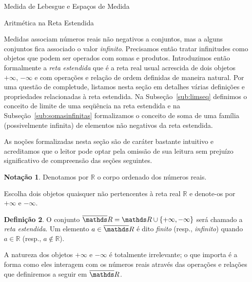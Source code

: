 \documentclass[oneside,final,11pt]{amsbook}
\newcommand{\R}{\mathds R}
\theoremstyle{remark}\newtheorem{exercise}{Exercício}[chapter]
\theoremstyle{remark}\newtheorem{*exercise}[exercise]{\hbox to 0pt{\hskip 0pt minus 1fil*}Exercício}
\theoremstyle{definition}\newtheorem{exdefin}{Definição}[chapter]
\theoremstyle{plain}\newtheorem{teo}{Teorema}[section]
\theoremstyle{plain}\newtheorem{lem}[teo]{Lema}
\theoremstyle{plain}\newtheorem{prop}[teo]{Proposição}
\theoremstyle{plain}\newtheorem{cor}[teo]{Corolário}
\theoremstyle{definition}\newtheorem{defin}[teo]{Definição}
\theoremstyle{remark}\newtheorem{rem}[teo]{Observação}
\theoremstyle{definition}\newtheorem{notation}[teo]{Notação}
\theoremstyle{definition}\newtheorem{convention}[teo]{Convenção}
\theoremstyle{definition}\newtheorem{example}[teo]{Exemplo}
\numberwithin{section}{chapter}
\numberwithin{equation}{section}
\begin{document}
\begin{chapter}{Medida de Lebesgue e Espaços de Medida}
\label{CHP:LEBESGUE}

\begin{section}{Aritmética na Reta Estendida}
\label{sec:AritRetaEstend}

Medidas associam números reais não negativos a conjuntos, mas a alguns conjuntos fica
associado o valor {\em infinito}. Precisamos então tratar infinitudes como objetos
que podem ser operados com somas e produtos. Introduzimos então formalmente a {\em reta estendida\/}
que é a reta real usual acrescida de dois objetos $+\infty$, $-\infty$ e com operações e relação de ordem
definidas de maneira natural. Por uma questão de completude, listamos nesta seção
em detalhes várias definições e propriedades relacionadas à reta estendida. Na Subseção~\ref{sub:limseq}
definimos o conceito de limite de uma seqüência na reta estendida e na Subseção~\ref{sub:somasinfinitas}
formalizamos o conceito de soma de uma família (possivelmente infinita) de elementos não
negativos da reta estendida.

As noções formalizadas nesta seção são de caráter bastante intuitivo e acreditamos que o leitor
pode optar pela omissão de sua leitura sem prejuízo significativo de compreensão das seções
seguintes.

\begin{notation}
Denotamos por $\R$\index[simbolos]{$\R$} o corpo ordenado dos números reais.
\end{notation}

Escolha dois objetos quaisquer não pertencentes à reta real $\R$ e denote-os por $+\infty$\index[simbolos]{$+\infty$}
e $-\infty$\index[simbolos]{$-\infty$}.
\begin{defin}
O conjunto $\overline\R=\R\cup\{+\infty,-\infty\}$\index[simbolos]{$\overline\R$} será chamado a {\em reta estendida}.
Um elemento $a\in\overline\R$ é dito {\em finito\/} (resp., {\em infinito})
quando $a\in\R$ (resp., $a\not\in\R$).
\end{defin}
A natureza dos objetos $+\infty$ e $-\infty$ é totalmente irrelevante; o que importa é a forma
como eles interagem com os números reais através das operações e relações que definiremos a seguir
em $\overline\R$.


\end{section}
\end{chapter}
\end{document}
